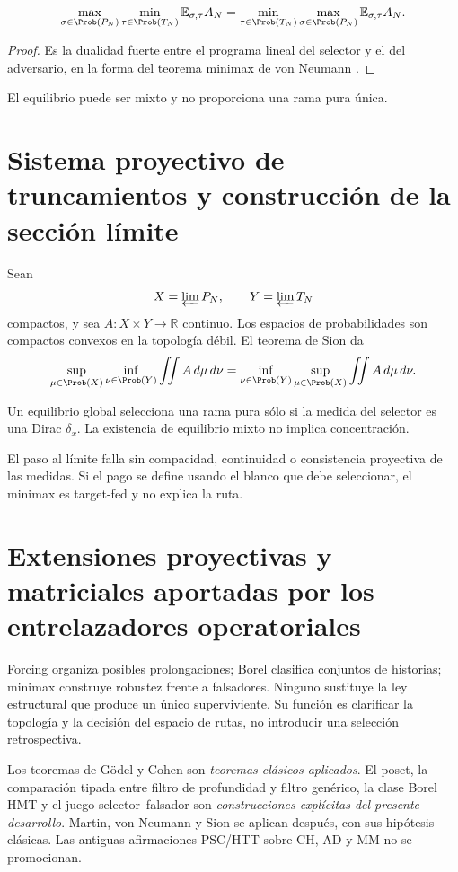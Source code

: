\begin{theorem}
\[
 \max_{\sigma\in\Prob(P_N)}
 \min_{\tau\in\Prob(T_N)}
 \mathbb E_{\sigma,\tau}A_N
 =
 \min_{\tau\in\Prob(T_N)}
 \max_{\sigma\in\Prob(P_N)}
 \mathbb E_{\sigma,\tau}A_N.
\]
\end{theorem}

\begin{proof}
Es la dualidad fuerte entre el programa lineal del selector y el del
adversario, en la forma del teorema minimax de von Neumann
\citep{vonneumann1928}.
\end{proof}

El equilibrio puede ser mixto y no proporciona una rama pura única.

\section{Sistema proyectivo de truncamientos y construcción de la sección límite}

Sean
\[
 X=\varprojlim P_N,
 \qquad
 Y=\varprojlim T_N
\]
compactos, y sea \(A:X\times Y\to\mathbb R\) continuo. Los espacios de
probabilidades son compactos convexos en la topología débil. El teorema de
Sion \citep{sion1958} da
\[
 \sup_{\mu\in\Prob(X)}\inf_{\nu\in\Prob(Y)}
 \iint A\,d\mu\,d\nu
 =
 \inf_{\nu\in\Prob(Y)}\sup_{\mu\in\Prob(X)}
 \iint A\,d\mu\,d\nu.
\]

\begin{corollary}
Un equilibrio global selecciona una rama pura sólo si la medida del selector
es una Dirac \(\delta_x\). La existencia de equilibrio mixto no implica
concentración.
\end{corollary}

\begin{remark}
El paso al límite falla sin compacidad, continuidad o consistencia
proyectiva de las medidas. Si el pago se define usando el blanco que debe
seleccionar, el minimax es target-fed y no explica la ruta.
\end{remark}

\section{Extensiones proyectivas y matriciales aportadas por los entrelazadores operatoriales}

Forcing organiza posibles prolongaciones; Borel clasifica conjuntos de
historias; minimax construye robustez frente a falsadores. Ninguno sustituye
la ley estructural que produce un único superviviente. Su función es
clarificar la topología y la decisión del espacio de rutas, no introducir una
selección retrospectiva.

\begin{remark}
Los teoremas de Gödel y Cohen son \emph{teoremas clásicos aplicados}. El
poset, la comparación tipada entre filtro de profundidad y filtro genérico,
la clase Borel HMT y el juego selector--falsador son
\emph{construcciones explícitas del presente desarrollo}. Martin, von Neumann y Sion se aplican
después, con sus hipótesis clásicas. Las antiguas afirmaciones PSC/HTT sobre
CH, AD y MM no se promocionan.
\end{remark}
